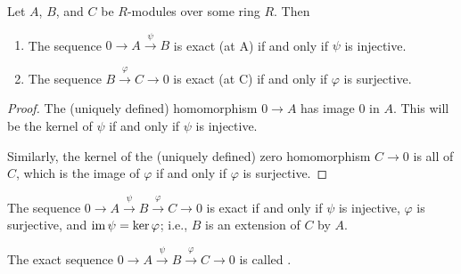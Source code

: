     \begin{proposition}
        Let $A$, $B$, and $C$ be $R$-modules over some ring $R$. Then
            \begin{enumerate}[label = (\arabic*)]
                \item The sequence $0 \rightarrow A \xrightarrow{\psi} B$ is exact (at A) if and only if $\psi$ is injective.
                \item The sequence $B \xrightarrow{\varphi} C \rightarrow 0$ is exact (at C) if and only if $\varphi$ is surjective.
            \end{enumerate}
    \end{proposition}
        \begin{proof}
            The (uniquely defined) homomorphism $0 \rightarrow A$ has image $0$ in $A$. This will be the kernel of $\psi$ if and only if $\psi$ is injective.

            Similarly, the kernel of the (uniquely defined) zero homomorphism $C \rightarrow 0$ is all of $C$, which is the image of $\varphi$ if and only if $\varphi$ is surjective.
        \end{proof}

    \begin{corollary}
        The sequence $0 \rightarrow A \xrightarrow{\psi} B \xrightarrow{\varphi} C \rightarrow 0$ is exact if and only if $\psi$ is injective, $\varphi$ is surjective, and $\operatorname{im}{\psi} = \ker{\varphi}$; i.e., $B$ is an extension of $C$ by $A$.
    \end{corollary}
    
    \begin{definition}
        The exact sequence $0 \rightarrow A \xrightarrow{\psi} B \xrightarrow{\varphi} C \rightarrow 0$ is called .
    \end{definition}

